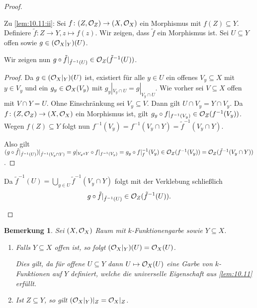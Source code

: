 \documentclass[12pt,a4paper]{scrartcl}
\theoremstyle{cplain}
\theoremstyle{cdef}
\newtheorem{beme}[thmcounter]{Bemerkung}
\begin{document}
\begin{proof}
\begin{description}
		Zu \ref{lem:10.11:ii}: Sei $f\colon (Z, \mathcal{O}_Z)\to (X,\mathcal{O}_X)$ ein Morphismus mit $f(Z)\subseteq Y$. Definiere $\tilde f\colon Z\to Y, z\mapsto f(z)$. Wir zeigen, dass $\tilde f$ ein Morphismus ist. Sei $U\subseteq Y$ offen sowie $g\in (\mathcal{O}_X|_Y)(U)$.
		
		Wir zeigen nun $g\circ \tilde f|_{\tilde f^{-1}(U)}\in \mathcal{O}_Z(\tilde f^{-1}(U))$.
		\begin{proof}
			Da $g\in (\mathcal{O}_X|_Y)(U)$ ist, existiert für alle $y\in U$ ein offenes $V_y\subseteq X$ mit $y\in V_y$ und ein $g_y\in \mathcal{O}_X(V_y)$ mit $g_y|_{V_y\cap U} = g|_{V_y\cap U}$. Wie vorher sei $V\subseteq X$ offen mit $V\cap Y = U$. Ohne Einschränkung sei $V_y\subseteq V$. Dann gilt $U\cap V_y = Y\cap V_y$. Da $f\colon (Z,\mathcal{O}_Z)\to (X,\mathcal{O}_X)$ ein Morphismus ist, gilt $g_y\circ f|_{f^{-1}(V_y)} \in \mathcal{O}_Z(f^{-1}(V_y))$. Wegen $f(Z)\subseteq Y$ folgt nun $f^{-1}(V_y) = f^{-1}(V_y\cap Y) = \tilde f^{-1}(V_y\cap Y)$.

			Also gilt $(g\circ \tilde f|_{\tilde f^{-1}(U)})|_{\tilde f^{-1}(V_y\cap Y)} = g|_{V_y\circ Y}\circ f|_{f^{-1}(V_y)} = g_y\circ f|_f^{-1}(V_y) \in \mathcal{O}_Z(f^{-1}(V_y)) = \mathcal{O}_Z(\tilde f^{-1}(V_y\cap Y))$.
		\end{proof}
		
		Da $\tilde f^{-1}(U) = \bigcup_{y\in U} \tilde f^{-1}(V_y\cap Y)$ folgt mit der Verklebung schließlich \[g\circ \tilde f|_{\tilde f^{-1}(U)} \in \mathcal{O}_Z(\tilde f^{-1}(U)).\qedhere\]
	\end{description}
\end{proof}

\begin{beme}
	Sei $(X,\mathcal{O}_X)$ Raum mit $k$-Funktionengarbe sowie $Y\subseteq X$.
	\begin{enumerate}
		\item Falls $Y\subseteq X$ offen ist, so folgt $(\mathcal{O}_X|_Y)(U) = \mathcal{O}_X(U)$.
		
		Dies gilt, da für offene $U\subseteq Y$ dann $U\mapsto \mathcal{O}_X(U)$ eine Garbe von $k$-Funktionen auf $Y$ definiert, welche die universelle Eigenschaft aus \cref{lem:10.11} erfüllt.
		\item Ist $Z\subseteq Y$, so gilt $(\mathcal{O}_X|_Y)|_Z = \mathcal{O}_X|_Z$. 
	\end{enumerate}
\end{beme}
\end{document}
